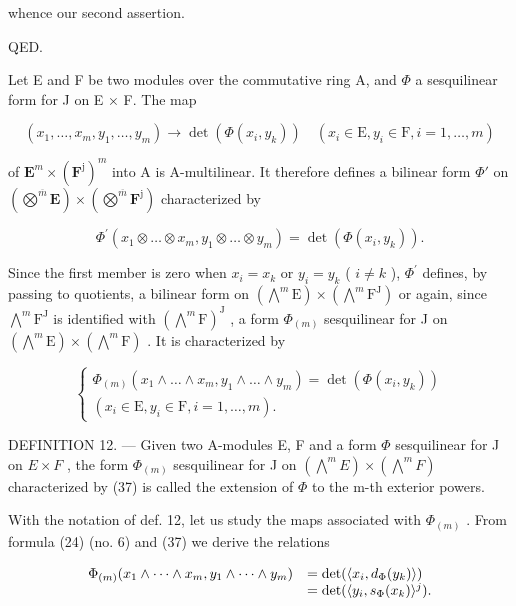 whence our second assertion.

QED.

Let E and F be two modules over the commutative ring A, and \(\Phi\) a sesquilinear form for J on E × F. The map

\[
(x _ {1}, \dots , x _ {m}, y _ {1}, \dots , y _ {m}) \rightarrow \det (\Phi (x _ {i}, y _ {k})) \quad (x _ {i} \in \mathrm{E}, y _ {i} \in \mathrm{F}, i = 1, \dots , m)
\]

of \(\mathbf{E}^{m}\times(\mathbf{F}^{\mathrm{j}})^{m}\) into A is A-multilinear. It therefore defines a bilinear form \(\Phi'\) on \((\bigotimes^{\overline{m}}\mathbf{E})\times(\bigotimes^{\overline{m}}\mathbf{F}^{\mathrm{j}})\) characterized by

\[
\Phi^ {\prime} (x _ {1} \otimes \dots \otimes x _ {m}, y _ {1} \otimes \dots \otimes y _ {m}) = \det (\Phi (x _ {i}, y _ {k})).
\]

Since the first member is zero when \(x_{i}=x_{k}\) or \(y_{i}=y_{k}\) ( \(i\neq k\) ), \(\Phi^{\prime}\) defines, by passing to quotients, a bilinear form on \((\bigwedge^{m}\mathrm{E})\times(\bigwedge^{m}\mathrm{F}^{\mathrm{J}})\) or again, since \(\bigwedge^{m}\mathrm{F}^{\mathrm{J}}\) is identified with \((\bigwedge^{m}\mathrm{F})^{\mathrm{J}}\) , a form \(\Phi_{(m)}\) sesquilinear for J on \((\bigwedge^{m}\mathrm{E})\times(\bigwedge^{m}\mathrm{F})\) . It is characterized by

\[
\left\{ \begin{array}{l} \Phi_ {(m)} (x _ {1} \wedge \dots \wedge x _ {m}, y _ {1} \wedge \dots \wedge y _ {m}) = \det (\Phi (x _ {i}, y _ {k})) \\ (x _ {i} \in \mathrm{E}, y _ {i} \in \mathrm{F}, i = 1, \dots , m). \end{array} \right.\tag{37}
\]

DEFINITION 12. --- Given two A-modules E, F and a form \(\Phi\) sesquilinear for J on \(E \times F\) , the form \(\Phi_{(m)}\) sesquilinear for J on \((\bigwedge^{m} E) \times (\bigwedge^{m} F)\) characterized by (37) is called the extension of \(\Phi\) to the m-th exterior powers.

With the notation of def. 12, let us study the maps associated with \(\Phi_{(m)}\) . From formula (24) (no. 6) and (37) we derive the relations

\[
\begin{array}{r l} \Phi_ {(m)} (x _ {1} \wedge \dots \wedge x _ {m}, y _ {1} \wedge \dots \wedge y _ {m}) & = \det (\langle x _ {i}, d _ {\Phi} (y _ {k}) \rangle) \\ & = \det (\langle y _ {i}, s _ {\Phi} (x _ {k}) \rangle^ {j}). \end{array}
\]

